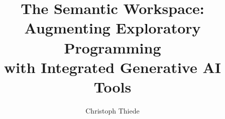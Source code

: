 \documentclass[draft,master,oneside]{swathesis}
\author{Christoph Thiede}
\title{The Semantic Workspace:\\[-4pt] Augmenting Exploratory Programming\\[0pt] with Integrated Generative AI Tools}
\begin{document}
\frontmatter
\maketitle


\cleardoublepage
\tableofcontents
\listoffigures
\listoftables
\mainmatter



\printbibliography[heading=bibintoc]
\clearpage
\appendix

\backmatter
\markboth{}\relax

\makeatletter
\gdef\swa@statementname{Declaration of Authorship}
\gdef\statementcontent{%
	I hereby certify that I have written this thesis independently and have used only the sources and tools indicated or permitted.
}
\end{document}
